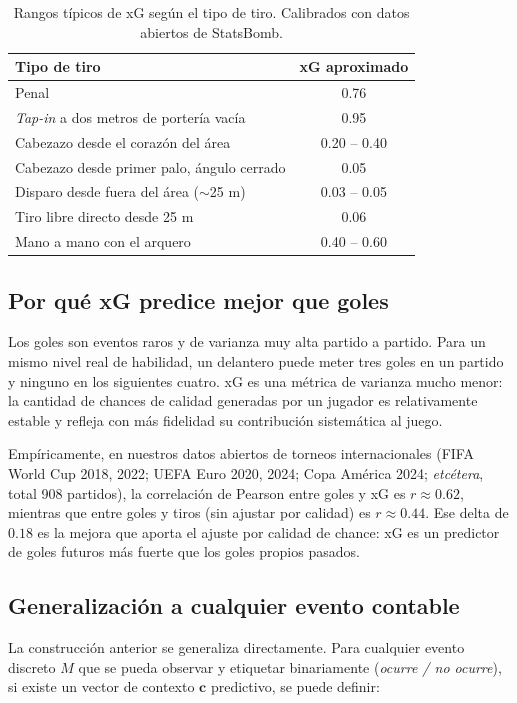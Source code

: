 \begin{table}[h]
\centering
\begin{tabular}{lc}
\toprule
\textbf{Tipo de tiro} & \textbf{xG aproximado} \\
\midrule
Penal & 0.76 \\
\emph{Tap-in} a dos metros de portería vacía & 0.95 \\
Cabezazo desde el corazón del área & 0.20 -- 0.40 \\
Cabezazo desde primer palo, ángulo cerrado & 0.05 \\
Disparo desde fuera del área ($\sim$25 m) & 0.03 -- 0.05 \\
Tiro libre directo desde 25 m & 0.06 \\
Mano a mano con el arquero & 0.40 -- 0.60 \\
\bottomrule
\end{tabular}
\caption{Rangos típicos de xG según el tipo de tiro. Calibrados con datos abiertos de StatsBomb.}
\end{table}

\subsection{Por qué xG predice mejor que goles}

Los goles son eventos raros y de varianza muy alta partido a partido. Para un mismo nivel real de habilidad, un delantero puede meter tres goles en un partido y ninguno en los siguientes cuatro. xG es una métrica de varianza mucho menor: la cantidad de chances de calidad generadas por un jugador es relativamente estable y refleja con más fidelidad su contribución sistemática al juego.

Empíricamente, en nuestros datos abiertos de torneos internacionales (FIFA World Cup 2018, 2022; UEFA Euro 2020, 2024; Copa América 2024; \emph{etcétera}, total 908 partidos), la correlación de Pearson entre goles y xG es $r \approx 0.62$, mientras que entre goles y tiros (sin ajustar por calidad) es $r \approx 0.44$. Ese delta de $0.18$ es la mejora que aporta el ajuste por calidad de chance: xG es un predictor de goles futuros más fuerte que los goles propios pasados.

\subsection{Generalización a cualquier evento contable}

La construcción anterior se generaliza directamente. Para cualquier evento discreto $M$ que se pueda observar y etiquetar binariamente (\emph{ocurre / no ocurre}), si existe un vector de contexto $\mathbf{c}$ predictivo, se puede definir:

